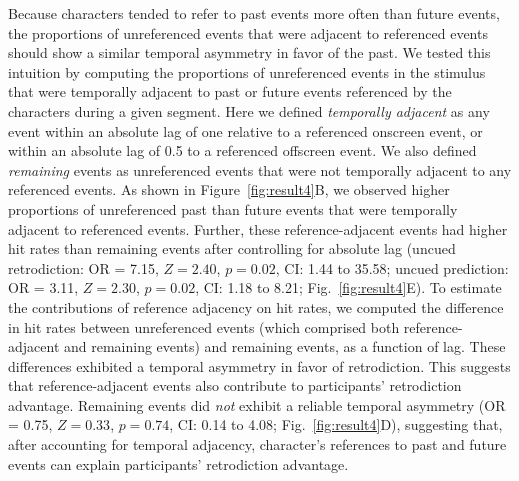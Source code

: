 \documentclass[10pt]{article}
\begin{document}
Because characters tended to refer to past events more often than future events, the proportions of unreferenced events that were adjacent to referenced events should show a similar temporal asymmetry in favor of the past.  We tested this intuition by computing the proportions of unreferenced events in the stimulus that were temporally adjacent to past or future events referenced by the characters during a given segment.  Here we defined \textit{temporally adjacent} as any event within an absolute lag of one relative to a referenced onscreen event, or within an absolute lag of 0.5 to a referenced offscreen event.  We also defined \textit{remaining} events as unreferenced events that were not temporally adjacent to any referenced events.  As shown in Figure~\ref{fig:result4}B, we observed higher proportions of unreferenced past than future events that were temporally adjacent to referenced events.  Further, these reference-adjacent events had higher hit rates than remaining events after controlling for absolute lag (uncued retrodiction: OR = 7.15, $Z = 2.40$, $p = 0.02$, CI: 1.44 to 35.58; uncued prediction: OR = 3.11, $Z = 2.30$, $p = 0.02$, CI: 1.18 to 8.21; Fig.~\ref{fig:result4}E).  To estimate the contributions of reference adjacency on hit rates, we computed the difference in hit rates between unreferenced events (which comprised both reference-adjacent and remaining events) and remaining events, as a function of lag.  These differences exhibited a temporal asymmetry in favor of retrodiction.  This suggests that reference-adjacent events also contribute to participants' retrodiction advantage.  Remaining events did \textit{not} exhibit a reliable temporal asymmetry (OR = 0.75, $Z = 0.33$, $p = 0.74$, CI: 0.14 to 4.08; Fig.~\ref{fig:result4}D), suggesting that, after accounting for temporal adjacency, character's references to past and future events can explain participants' retrodiction advantage.
\end{document}
